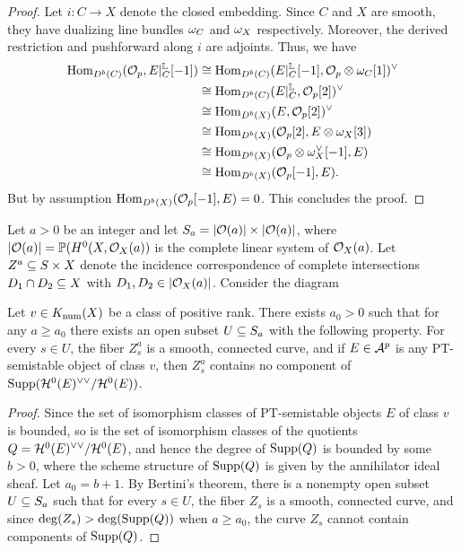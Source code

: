 \begin{proof}
Let $i: C \to X$ denote the closed embedding. Since $C$ and $X$ are smooth, they have dualizing line bundles $\omega_C$ and $\omega_X$ respectively. Moreover, the derived restriction and pushforward along $i$ are adjoints. Thus, we have
\begin{align*}
    \mathrm{Hom}_{D^b(C)}(\mathcal{O}_p, E|^{\mathbb{L}}_C[-1]) & \cong \mathrm{Hom}_{D^b(C)}(E|^{\mathbb{L}}_C[-1], \mathcal{O}_p \otimes \omega_C [1])^\vee \\
    & \cong \mathrm{Hom}_{D^b(C)}(E|^{\mathbb{L}}_C, \mathcal{O}_p[2])^\vee \\
    & \cong \mathrm{Hom}_{D^b(X)}(E, \mathcal{O}_p[2])^\vee \\
    & \cong \mathrm{Hom}_{D^b(X)}(\mathcal{O}_p[2], E \otimes \omega_X[3]) \\
    & \cong \mathrm{Hom}_{D^b(X)}(\mathcal{O}_p \otimes \omega_X^\vee[-1], E) \\
    & \cong \mathrm{Hom}_{D^b(X)}(\mathcal{O}_p[-1], E).
\end{align*}
But by assumption $\mathrm{Hom}_{D^b(X)}(\mathcal{O}_p[-1], E) = 0$. This concludes the proof.
\end{proof}

Let $a > 0$ be an integer and let $S_a = |\mathcal{O}(a)| \times |\mathcal{O}(a)|$, where $|\mathcal{O}(a)| = \mathbb{P}(H^0(X, \mathcal{O}_X(a))$ is the complete linear system of $\mathcal{O}_X(a)$. Let $Z^a \subseteq S \times X$ denote the incidence correspondence of complete intersections $D_1 \cap D_2 \subseteq X$ with $D_1, D_2 \in |\mathcal{O}_X(a)|$. Consider the diagram
\begin{center}
\end{center}
\begin{lem}\label{nocomponent}
    Let $v \in K_{\mathrm{num}}(X)$ be a class of positive rank. There exists $a_0 > 0$ such that for any $a \ge a_0$ there exists an open subset $U \subseteq S_a$ with the following property. For every $s \in U$, the fiber $Z^a_s$ is a smooth, connected curve, and if $E \in \mathcal{A}^p$ is any PT-semistable object of class $v$, then $Z^a_s$ contains no component of $\operatorname{\mathrm{Supp}}(\mathcal{H}^0(E)^{\vee\vee}/\mathcal{H}^0(E))$.
\end{lem}
\begin{proof}
    Since the set of isomorphism classes of PT-semistable objects $E$ of class $v$ is bounded, so is the set of isomorphism classes of the quotients $Q = \mathcal{H}^0(E)^{\vee\vee}/\mathcal{H}^0(E)$, and hence the degree of $\operatorname{\mathrm{Supp}}(Q)$ is bounded by some $b > 0$, where the scheme structure of $\operatorname{\mathrm{Supp}}(Q)$ is given by the annihilator ideal sheaf. Let $a_0 = b + 1$. By Bertini's theorem, there is a nonempty open subset $U \subseteq S_a$ such that for every $s \in U$, the fiber $Z_s$ is a smooth, connected curve, and since $\deg(Z_s) > \deg(\operatorname{\mathrm{Supp}}(Q))$ when $a \ge a_0$, the curve $Z_s$ cannot contain components of $\operatorname{\mathrm{Supp}}(Q)$.
\end{proof}

